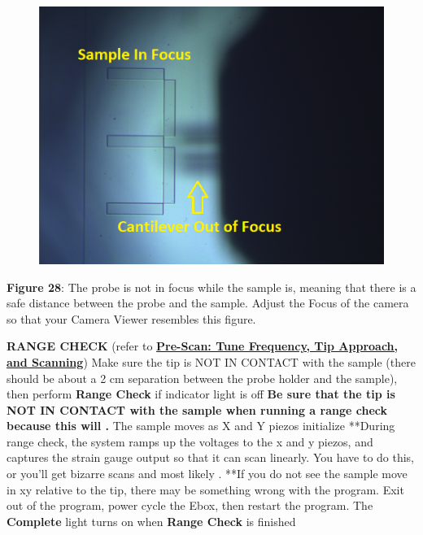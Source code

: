 \documentclass{../lab}
\begin{document}
\begin{figure}[h]
    \centering
    \href{http://dev-physicsadv.pantheon.berkeley.edu/sites/default/files/AFMImages/probe_unfocused1_0.png}{\includegraphics[width=0.5\linewidth]{images/probe_unfocused1_0.png}}
    \caption{}
    \label{fig:probe_unfocused1_0}
\end{figure}


\textbf{Figure 28}:  The probe is not in focus while the sample is, meaning that there is a safe distance between the probe and the sample.  Adjust the Focus of the camera so that your Camera Viewer resembles this figure.

\textbf{RANGE CHECK }(refer to \href{http://experimentationlab.berkeley.edu/sites/default/files/prescan\_final2.mp4}{\textbf{Pre-Scan: Tune Frequency, Tip Approach, and Scanning}})
Make sure the tip is NOT IN CONTACT with the sample (there should be about a 2 cm separation between the probe holder and the sample), then perform \textbf{Range Check} if indicator light is off
\textbf{Be sure that the tip is NOT IN CONTACT with the sample when running a range check because this will .}
The sample moves as X and Y piezos initialize
**During range check, the system ramps up the voltages to the x and y piezos, and captures the strain gauge output so that it can scan linearly. You have to do this, or you'll get bizarre scans and most likely .
**If you do not see the sample move in xy relative to the tip, there may be something wrong with the program.  Exit out of the program, power cycle the Ebox, then restart the program.
The \textbf{Complete} light turns on when \textbf{Range Check} is finished
\end{document}
